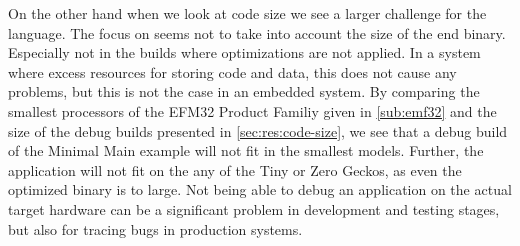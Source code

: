 On the other hand when we look at code size we see a larger challenge for the {\rust} language.
The focus on  seems not to take into account the size of the end binary.
Especially not in the builds where optimizations are not applied.
In a system where excess resources for storing code and data, this does not cause any problems, but this is not the case in an embedded system.
By comparing the smallest processors of the EFM32 Product Familiy given in \autoref{sub:emf32} and the size of the debug builds presented in \autoref{sec:res:code-size}, we see that a debug build of the Minimal Main example will not fit in the smallest models.
Further, the {\tracker} application will not fit on the any of the Tiny or Zero Geckos, as even the optimized binary is to large.
Not being able to debug an application on the actual target hardware can be a significant problem in development and testing stages, but also for tracing bugs in production systems.
